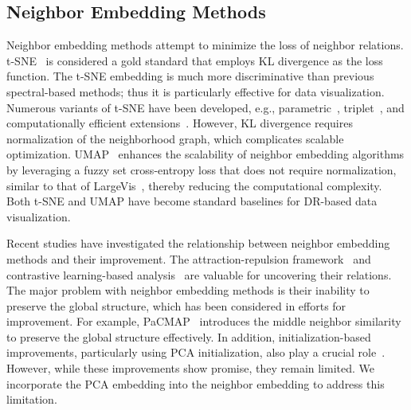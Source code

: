 \subsection{Neighbor Embedding Methods}
\label{subsec:ne_methods}
Neighbor embedding methods attempt to minimize the loss of neighbor relations. t-SNE~\cite{van2008visualizing} is considered a gold standard that employs KL divergence as the loss function. The t-SNE embedding is much more discriminative than previous spectral-based methods; thus it is particularly effective for data visualization. Numerous variants of t-SNE have been developed, e.g., parametric~\citep{van2009learning}, triplet~\citep{van2012stochastic}, and computationally efficient extensions~\cite{van2014accelerating, fu2019atsne}. However, KL divergence requires normalization of the neighborhood graph, which complicates scalable optimization. UMAP~\cite{mcinnes2018umap} enhances the scalability of neighbor embedding algorithms by leveraging a fuzzy set cross-entropy loss that does not require normalization, similar to that of LargeVis~\cite{tang2016visualizing}, thereby reducing the computational complexity. Both t-SNE and UMAP have become standard baselines for DR-based data visualization. 
\par
Recent studies have investigated the relationship between neighbor embedding methods and their improvement. The attraction-repulsion framework~\cite{bohm2022attraction, jenssen2024map} and contrastive learning-based analysis~\cite{artemenkov2020ncvis, damrich2022t} are valuable for uncovering their relations. The major problem with neighbor embedding methods is their inability to preserve the global structure, which has been considered in efforts for improvement. For example, PaCMAP~\cite{wang2021understanding} introduces the middle neighbor similarity to preserve the global structure effectively. In addition, initialization-based improvements, particularly using PCA initialization, also play a crucial role~\cite{kobak2019art, kobak2021initialization}. However, while these improvements show promise, they remain limited. We incorporate the PCA embedding into the neighbor embedding to address this limitation.